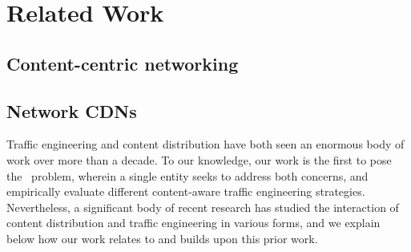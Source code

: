 \chapter{Related Work}


\section{Content-centric networking}

\section{Network CDNs}
\label{sec:ncdn-related}

Traffic engineering and content distribution have both seen an enormous body of work over more than a decade. To our knowledge, our work is the first to pose the \ncp\ problem, wherein a single entity seeks to address both concerns, and empirically evaluate different content-aware traffic engineering strategies. Nevertheless, a significant body of recent research has studied the interaction of content distribution and traffic engineering in various forms, and we explain below how our work relates to and builds upon this prior work.



